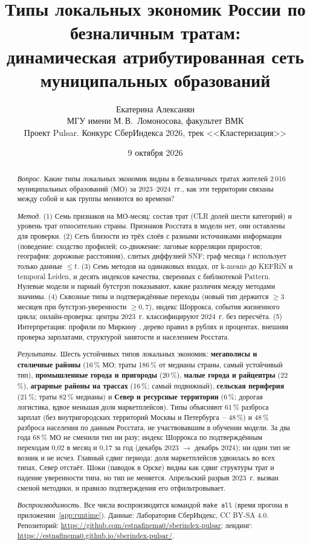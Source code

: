 \documentclass[11pt,a4paper]{article}
\title{Типы локальных экономик России по безналичным тратам:\\ динамическая атрибутированная сеть муниципальных образований}
\author{Екатерина Алексанян\\[2pt]
\small МГУ имени М.\,В.~Ломоносова, факультет ВМК\\[6pt]
\small Проект Pulsar. Конкурс СберИндекса 2026, трек <<Кластеризация>>}
\date{9 октября 2026}
\begin{document}
\maketitle

\begin{abstract}
\noindent\textit{Вопрос.} Какие типы локальных экономик видны в безналичных тратах жителей 2\,016 муниципальных образований (МО) за 2023--2024~гг., как эти территории связаны между собой и как группы меняются во времени?

\smallskip\noindent\textit{Метод.} (1) Семь признаков на МО-месяц: состав трат (CLR долей шести категорий) и уровень трат относительно страны. Признаков Росстата в модели нет, они оставлены для проверки. (2) Сеть близости из трёх слоёв с разными источниками информации (поведение: сходство профилей; со-движение: лаговые корреляции приростов; география: дорожные расстояния), слитых диффузией SNF; граф месяца $t$ использует только данные $\le t$. (3) Семь методов на одинаковых входах, от k-means до KEFRiN и temporal Leiden, и десять индексов качества, сверенных с библиотекой Pattern. Нулевые модели и парный бутстрэп показывают, какие различия между методами значимы. (4) Сквозные типы и подтверждённые переходы (новый тип держится $\ge 3$ месяцев при бутстрэп-уверенности $\ge 0{,}7$), индекс Шоррокса, события жизненного цикла; онлайн-проверка: центры 2023~г. классифицируют 2024~г. без пересчёта. (5) Интерпретация: профили по Миркину \cite{mirkin-book}, дерево правил в рублях и процентах, внешняя проверка зарплатами, структурой занятости и населением Росстата.

\smallskip\noindent\textit{Результаты.} Шесть устойчивых типов локальных экономик: \textbf{мегаполисы и столичные районы} (16\,\% МО; траты 186\,\% от медианы страны, самый устойчивый тип), \textbf{промышленные города и пригороды} (20\,\%), \textbf{малые города и райцентры} (22\,\%), \textbf{аграрные районы на трассах} (16\,\%; самый подвижный), \textbf{сельская периферия} (21\,\%; траты 82\,\% медианы) и \textbf{Север и ресурсные территории} (6\,\%; дорогая логистика, вдвое меньшая доля маркетплейсов). Типы объясняют 61\,\% разброса зарплат (без внутригородских территорий Москвы и Петербурга~-- 48\,\%) и 48\,\% разброса населения по данным Росстата, не участвовавшим в обучении модели. За два года 68\,\% МО не сменили тип ни разу; индекс Шоррокса по подтверждённым переходам 0,02 в месяц и 0,17 за год (декабрь 2023 $\to$ декабрь 2024); ни один тип не возник и не исчез. Главный сдвиг периода: доля маркетплейсов удвоилась во всех типах, Север отстаёт. Шоки (паводок в Орске) видны как сдвиг структуры трат и падение уверенности типа, но тип не меняется. Апрельский разрыв 2023~г. вызван сменой методики, и правило подтверждения его отфильтровывает.

\smallskip\noindent\textit{Воспроизводимость.} Все числа воспроизводятся командой \texttt{make all} (время прогона в приложении~\ref{app:runtime}). Данные: Лаборатория СберИндекс, CC BY-SA 4.0. Репозиторий: \url{https://github.com/estnafinema0/sberindex-pulsar}; лендинг: \url{https://estnafinema0.github.io/sberindex-pulsar/}.
\end{abstract}
\end{document}

